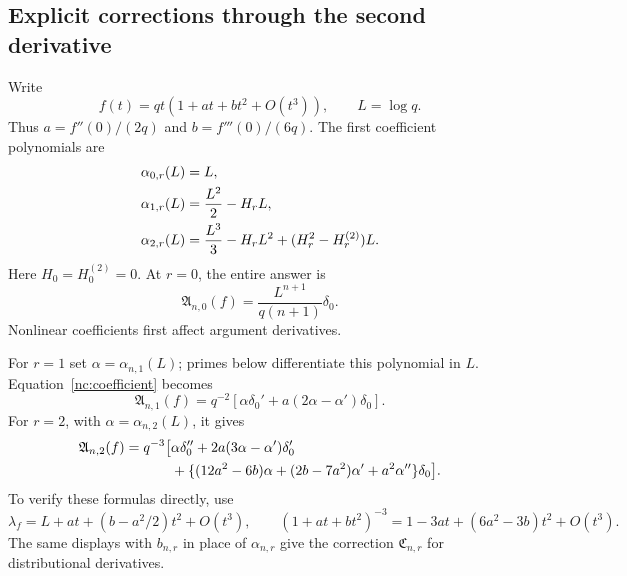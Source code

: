 \subsection{Explicit corrections through the second derivative}

Write
\begin{equation}\label{nc:f-expansion}
 f(t)=qt(1+a t+b t^2+O(t^3)),\qquad L=\log q.
\end{equation}
Thus $a=f''(0)/(2q)$ and $b=f'''(0)/(6q)$. The first coefficient
polynomials are
\begin{align}
 \alpha_{0,r}(L)&=L,\notag\\
 \alpha_{1,r}(L)&=\frac{L^2}{2}-H_rL,\label{nc:first-alpha}\\
 \alpha_{2,r}(L)&=\frac{L^3}{3}-H_rL^2
                    +(H_r^2-H_r^{(2)})L.\notag
\end{align}
Here $H_0=H_0^{(2)}=0$. At $r=0$, the entire answer is
\begin{equation}\label{nc:undifferentiated}
 \mathfrak A_{n,0}(f)=\frac{L^{n+1}}{q(n+1)}\delta_0.
\end{equation}
Nonlinear coefficients first affect argument derivatives.

For $r=1$ set $\alpha=\alpha_{n,1}(L)$; primes below differentiate
this polynomial in $L$. Equation~\eqref{nc:coefficient} becomes
\begin{equation}\label{nc:r1}
 \mathfrak A_{n,1}(f)
  =q^{-2}\left[\alpha\delta_0'
                   +a(2\alpha-\alpha')\delta_0\right].
\end{equation}
For $r=2$, with $\alpha=\alpha_{n,2}(L)$, it gives
\begin{align}\label{nc:r2}
 \mathfrak A_{n,2}(f)=q^{-3}\bigl[&\alpha\delta_0''
       +2a(3\alpha-\alpha')\delta_0'\notag\\
       &+\{(12a^2-6b)\alpha+(2b-7a^2)\alpha'
                                      +a^2\alpha''\}\delta_0\bigr].
\end{align}
To verify these formulas directly, use
\[
 \lambda_f=L+a t+(b-a^2/2)t^2+O(t^3),\qquad
 (1+a t+b t^2)^{-3}
      =1-3a t+(6a^2-3b)t^2+O(t^3).
\]
The same displays with $b_{n,r}$ in place of $\alpha_{n,r}$ give the
correction $\mathfrak C_{n,r}$ for distributional derivatives.


